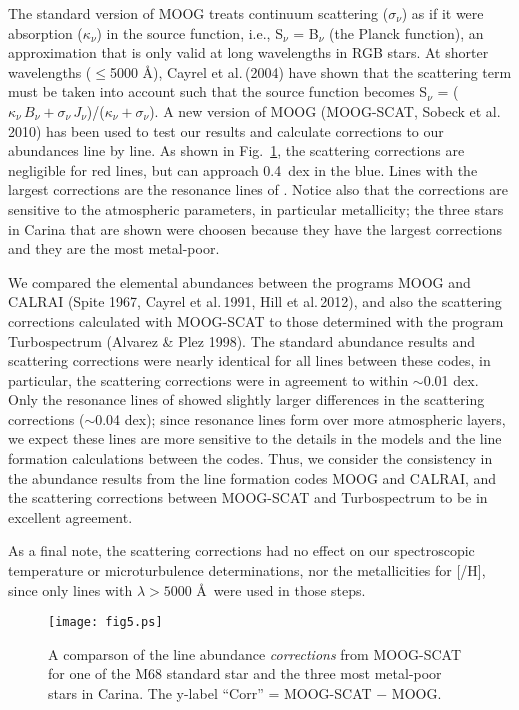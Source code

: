 \documentclass{emulateapj}
\newcommand\etal{{\rm et al.\,}}
\begin{document}
The standard version of MOOG treats continuum scattering 
($\sigma_\nu$) as if it were absorption ($\kappa_\nu$)
in the source function, 
i.e., S$_\nu$ = B$_\nu$ (the Planck function), 
an approximation that is only valid at long wavelengths
in RGB stars.   At shorter wavelengths ($\le$5000 \AA), 
Cayrel \etal (2004) have shown that the scattering term must be 
taken into account such that the source function becomes 
S$_\nu$ = 
($\kappa_\nu \, B_\nu + \sigma_\nu \, J_\nu$)/($\kappa_\nu + \sigma_\nu$).
% 
A new version of MOOG (MOOG-SCAT, Sobeck \etal  2010) has been 
used to test our results and calculate corrections 
to our abundances line by line.
As shown in Fig.~\ref{moogscat}, the scattering corrections 
are negligible for red lines, but can approach 0.4~dex in the blue.
Lines with the largest corrections are the resonance lines of
.   Notice also that the corrections are sensitive to
the atmospheric parameters, in particular metallicity; the three
stars in Carina that are shown were choosen because they have the
largest corrections and they are the most metal-poor.

We compared the elemental abundances between the programs MOOG
and CALRAI (Spite 1967, Cayrel \etal  1991, Hill \etal  2012),
and also the scattering corrections calculated with MOOG-SCAT
to those determined with the program 
Turbospectrum (Alvarez \& Plez 1998). The standard abundance
results and scattering corrections were nearly identical for 
all lines between these codes, in particular, the scattering
corrections were in agreement to within $\sim$0.01 dex.  
Only the resonance lines of  showed slightly larger 
differences in the scattering corrections ($\sim$0.04 dex);  
since resonance lines form over more atmospheric layers, 
we expect these lines are more sensitive to the details in
the models and the line formation calculations between the codes. 
Thus, we consider the consistency in the abundance results from 
the line formation codes MOOG and CALRAI, and the scattering
corrections between MOOG-SCAT and Turbospectrum to be in 
excellent agreement.

As a final note, the scattering corrections had no effect on our 
spectroscopic temperature or microturbulence determinations, 
nor the metallicities for [/H], since only  
lines with $\lambda > 5000$ \AA\ were used in those steps.


\begin{figure}[t]
\texttt{[image: fig5.ps]}
\caption{
A comparson of the line abundance {\it corrections} from 
MOOG-SCAT for one of the M68 standard star and the three 
most metal-poor stars in Carina.
The y-label ``Corr'' = MOOG-SCAT $-$ MOOG. \\
}
\label{moogscat}
\end{figure}
\end{document}
